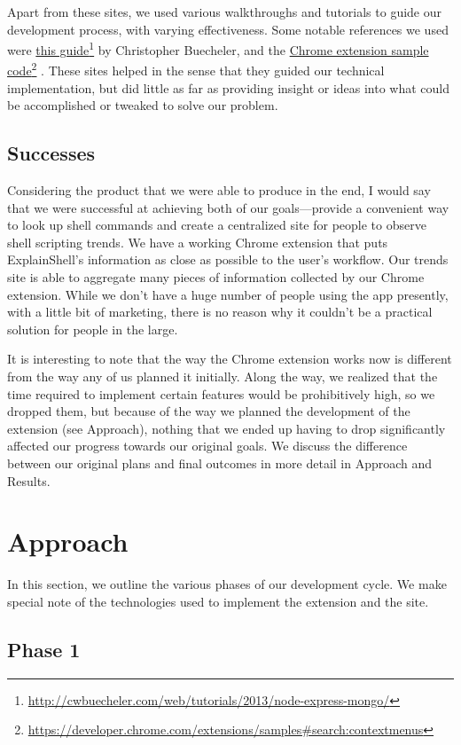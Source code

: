 \documentclass[11pt]{article}
\newcommand\fnurl[2]{%
\href{#1}{#2}\footnote{\url{#1}}%
}
\begin{document}
Apart from these sites, we used various walkthroughs and tutorials to guide our
development process, with varying effectiveness. Some notable references we used
were \fnurl{http://cwbuecheler.com/web/tutorials/2013/node-express-mongo/}{this
guide} by Christopher Buecheler, and the
\fnurl{https://developer.chrome.com/extensions/samples\#search:contextmenus}%
{Chrome extension sample code}. These sites helped in the sense that they guided
our technical implementation, but did little as far as providing insight or
ideas into what could be accomplished or tweaked to solve our problem.

\subsection{Successes}

Considering the product that we were able to produce in the end, I would say
that we were successful at achieving both of our goals---provide a convenient
way to look up shell commands and create a centralized site for people to
observe shell scripting trends. We have a working Chrome extension that puts
ExplainShell's information as close as possible to the user's workflow. Our
trends site is able to aggregate many pieces of information collected by our
Chrome extension. While we don't have a huge number of people using the app
presently, with a little bit of marketing, there is no reason why it couldn't
be a practical solution for people in the large.

It is interesting to note that the way the Chrome extension works now is
different from the way any of us planned it initially. Along the way, we
realized that the time required to implement certain features would be
prohibitively high, so we dropped them, but because of the way we planned the
development of the extension (see Approach), nothing that we ended up having to
drop significantly affected our progress towards our original goals. We discuss
the difference between our original plans and final outcomes in more detail in
Approach and Results.

\section{Approach}

In this section, we outline the various phases of our development cycle. We make
special note of the technologies used to implement the extension and the site.

\subsection{Phase 1}
\end{document}
